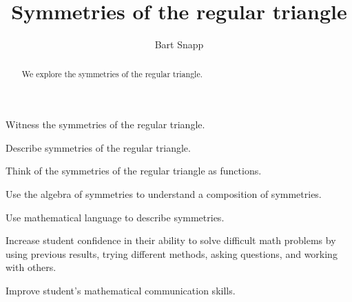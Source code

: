 \documentclass[noauthor,nooutcomes,hints,handout]{ximera}
\title{Symmetries of the regular triangle}
\author{Bart Snapp}
\begin{document}
\begin{abstract}
  We explore the symmetries of the regular triangle.
\end{abstract}
\maketitle

\begin{listOutcomes}
\item Witness the symmetries of the regular triangle.
\item Describe symmetries of the regular triangle.
\item Think of the symmetries of the regular triangle as functions.
\item Use the algebra of symmetries to understand a composition of symmetries.
\end{listOutcomes}

\begin{listObjectives}
 \item Use mathematical language to describe symmetries.
 \item Increase student confidence in their ability to solve difficult math problems by using previous results, trying different methods, asking questions, and working with others.
\item Improve student’s mathematical communication skills.
\end{listObjectives}
\end{document}
